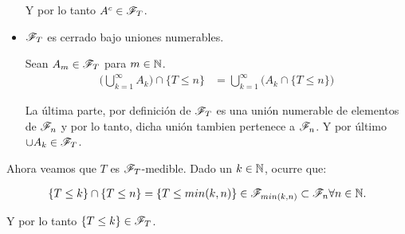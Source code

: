 \begin{itemize}
			Y por lo tanto ${A^c \in \mathscr{F}_T}$.\\
			
		\item ${\mathscr{F}_T}$ es cerrado bajo uniones numerables.
		
			Sean ${A_m \in \mathscr{F}_T}$ para ${m \in \mathbb{N}}$.
			\begin{align}
				\bigg( \bigcup_{k=1}^\infty A_k \bigg) \cap \{ T \leq n \} 	&=	\bigcup_{k=1}^\infty \bigg( A_k \cap \{ T \leq n \} \bigg)
			\end{align}								
			
			La última parte, por definición de ${\mathscr{F}_T}$ es una unión numerable de elementos de ${\mathscr{F}_n}$ y por lo tanto, dicha unión
			tambien pertenece a ${\mathscr{F}_n}$. Y por último ${\cup A_k \in \mathscr{F}_T}$.
	\end{itemize}
	
	Ahora veamos que $T$ es $\mathscr{F}_T$-medible. Dado un $k \in \mathbb{N}$, ocurre que:
	
	\begin{align}
		\{T \leq k\} \cap \{T \leq n\} = \{T \leq min(k,n)\} \in \mathscr{F}_{min(k, n)} \subset \mathscr{F}_n \forall n \in \mathbb{N}.
	\end{align}

	Y por lo tanto $\{T \leq k\} \in \mathscr{F}_T$.
	